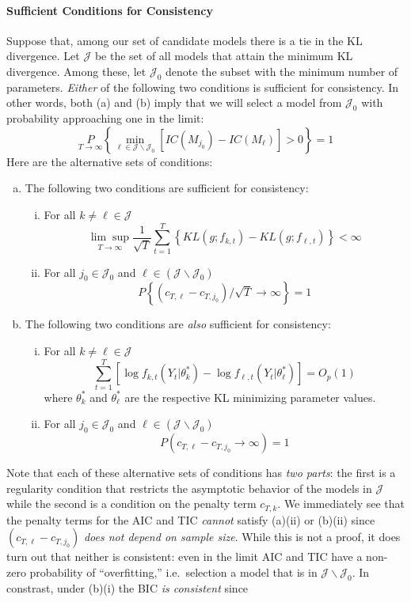 \documentclass[12pt]{article}
\theoremstyle{definition}
\begin{document}
\paragraph{Sufficient Conditions for Consistency}
Suppose that, among our set of candidate models there is a tie in the KL divergence. Let $\mathcal{J}$ be the set of all models that attain the minimum KL divergence. Among these, let $\mathcal{J}_0$ denote the subset with the minimum number of parameters. \emph{Either} of the following two conditions is sufficient for consistency. In other words, both (a) and (b) imply that we will select a model from $\mathcal{J}_0$ with probability approaching one in the limit:
	$$\underset{T\rightarrow \infty}P\left\{ \underset{\ell \in \mathcal{J}\backslash \mathcal{J}_0}{\min} \left[ IC(M_{j_0}) - IC(M_\ell)\right] > 0 \right\} = 1$$
Here are the alternative sets of conditions: 
	\begin{enumerate}[(a)]
		\item The following two conditions are sufficient for consistency:
			\begin{enumerate}[(i)]
				\item For all $k \neq \ell \in \mathcal{J}$ 
					$$\underset{T\rightarrow \infty}{\lim\sup} \frac{1}{\sqrt{T}} \sum_{t=1}^T\left\{ KL(g; f_{k,t}) - KL(g;f_{\ell,t}) \right\}<\infty$$
				\item For all $j_0 \in \mathcal{J}_0$ and $\ell \in (\mathcal J \backslash \mathcal{J}_0)$
					$$P\left\{\left(c_{T,\ell} - c_{T,j_0} \right)/\sqrt{T} \rightarrow \infty \right\}= 1$$
			\end{enumerate}
		\item The following two conditions are \emph{also} sufficient for consistency:
			\begin{enumerate}[(i)]
				\item For all $k \neq \ell \in \mathcal{J}$ 
					$$\sum_{t=1}^T \left[\log f_{k,t}(Y_t|\theta^*_k) - \log f_{\ell,t}(Y_t|\theta^*_\ell) \right] = O_p(1)$$
				where $\theta^*_k$ and $\theta^*_\ell$ are the respective KL minimizing parameter values.
				\item For all $j_0 \in \mathcal{J}_0$ and $\ell \in (\mathcal J \backslash \mathcal{J}_0)$
					$$P\left(c_{T,\ell} - c_{T,j_0} \rightarrow \infty \right) = 1$$
			\end{enumerate}
	\end{enumerate}
Note that each of these alternative sets of conditions has \emph{two parts}: the first is a regularity condition that restricts the asymptotic behavior of the models in $\mathcal{J}$ while the second is a condition on the penalty term $c_{T,k}$. We immediately see that the penalty terms for the AIC and TIC \emph{cannot} satisfy (a)(ii) or (b)(ii) since $(c_{T,\ell} - c_{T,j_0})$ \emph{does not depend on sample size}. While this is not a proof, it does turn out that neither is consistent: even in the limit AIC and TIC have a non-zero probability of ``overfitting,'' i.e.\ selection a model that is in $\mathcal{J}\backslash \mathcal{J}_0$. In constrast, under (b)(i) the BIC \emph{is consistent} since
\end{document}
